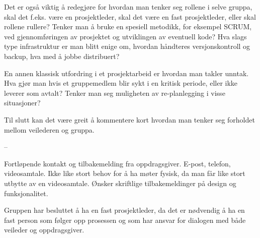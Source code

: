 \documentclass[11pt,a4paper]{report}
\begin{document}
Det er også viktig å redegjøre for hvordan man tenker seg rollene i selve gruppa, skal det f.eks. være en prosjektleder, skal det være en fast prosjektleder, eller skal rollene rullere? Tenker man å bruke en spesiell metodikk, for eksempel SCRUM, ved gjennomføringen av prosjektet og utviklingen av eventuell kode? Hva slags type infrastruktur er man blitt enige om, hvordan håndteres versjonskontroll og backup, hva med å jobbe distribuert?

En annen klassisk utfordring i et prosjektarbeid er hvordan man takler unntak. Hva gjør man hvis et gruppemedlem blir sykt i en kritisk periode, eller ikke leverer som avtalt? Tenker man seg muligheten av re-planlegging i visse situasjoner?

Til slutt kan det være greit å kommentere kort hvordan man tenker seg forholdet mellom veilederen og gruppa. 

--

Fortløpende kontakt og tilbakemelding fra oppdragsgiver. E-post, telefon, videosamtale. Ikke like stort behov for å ha møter fysisk, da man får like stort utbytte av en videosamtale. Ønsker skriftlige tilbakemeldinger på design og funksjonalitet. 

Gruppen har besluttet å ha en fast prosjektleder, da det er nødvendig å ha en fast person som følger opp prosessen og som har ansvar for dialogen med både veileder og oppdragsgiver.
\end{document}

